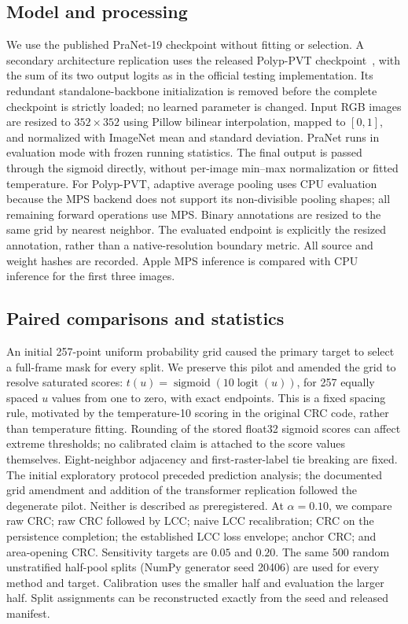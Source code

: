 \documentclass[11pt,a4paper]{article}
\begin{document}
\subsection{Model and processing}
We use the published PraNet-19 checkpoint without fitting or selection. A secondary architecture replication uses the released Polyp-PVT checkpoint~\cite{pvt}, with the sum of its two output logits as in the official testing implementation. Its redundant standalone-backbone initialization is removed before the complete checkpoint is strictly loaded; no learned parameter is changed. Input RGB images are resized to $352\times352$ using Pillow bilinear interpolation, mapped to $[0,1]$, and normalized with ImageNet mean and standard deviation. PraNet runs in evaluation mode with frozen running statistics. The final output is passed through the sigmoid directly, without per-image min--max normalization or fitted temperature. For Polyp-PVT, adaptive average pooling uses CPU evaluation because the MPS backend does not support its non-divisible pooling shapes; all remaining forward operations use MPS. Binary annotations are resized to the same grid by nearest neighbor. The evaluated endpoint is explicitly the resized annotation, rather than a native-resolution boundary metric. All source and weight hashes are recorded. Apple MPS inference is compared with CPU inference for the first three images.

\subsection{Paired comparisons and statistics}
An initial 257-point uniform probability grid caused the primary target to select a full-frame mask for every split. We preserve this pilot and amended the grid to resolve saturated scores: $t(u)=\operatorname{sigmoid}(10\operatorname{logit}(u))$, for 257 equally spaced $u$ values from one to zero, with exact endpoints. This is a fixed spacing rule, motivated by the temperature-10 scoring in the original CRC code, rather than temperature fitting. Rounding of the stored float32 sigmoid scores can affect extreme thresholds; no calibrated claim is attached to the score values themselves. Eight-neighbor adjacency and first-raster-label tie breaking are fixed. The initial exploratory protocol preceded prediction analysis; the documented grid amendment and addition of the transformer replication followed the degenerate pilot. Neither is described as preregistered. At $\alpha=0.10$, we compare raw CRC; raw CRC followed by LCC; naive LCC recalibration; CRC on the persistence completion; the established LCC loss envelope; anchor CRC; and area-opening CRC. Sensitivity targets are $0.05$ and $0.20$. The same 500 random unstratified half-pool splits (NumPy generator seed 20406) are used for every method and target. Calibration uses the smaller half and evaluation the larger half. Split assignments can be reconstructed exactly from the seed and released manifest.
\end{document}
